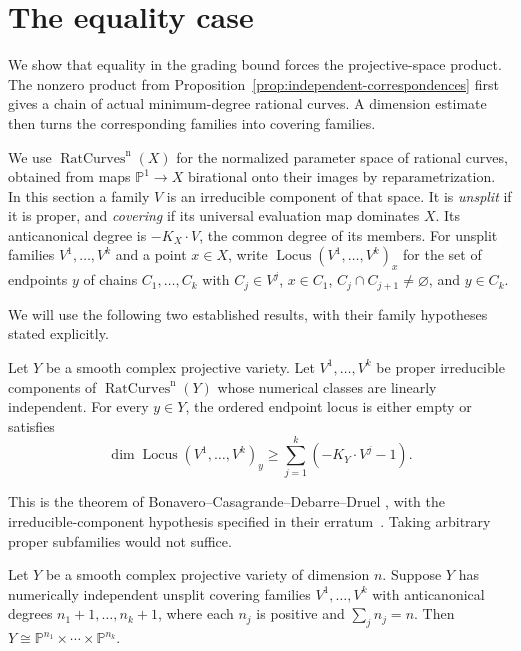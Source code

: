 \section{The equality case}
\label{sec:equality}

We show that equality in the grading bound forces the projective-space
product.  The nonzero product from
Proposition~\ref{prop:independent-correspondences} first gives a chain
of actual minimum-degree rational curves.  A dimension estimate then
turns the corresponding families into covering families.

We use $\operatorname{RatCurves}^{\mathrm n}(X)$ for the normalized
parameter space of rational curves, obtained from maps
$\mathbb P^1\to X$ birational onto their images by reparametrization.
In this section a family $V$ is an irreducible component of that space.
It is \emph{unsplit} if it is proper, and \emph{covering} if its
universal evaluation map dominates $X$.  Its anticanonical degree is
$-K_X\cdot V$, the common degree of its members.  For unsplit families
$V^1,\ldots,V^k$ and a point $x\in X$, write
$\operatorname{Locus}(V^1,\ldots,V^k)_x$ for the set of endpoints $y$
of chains $C_1,\ldots,C_k$ with $C_j\in V^j$, $x\in C_1$,
$C_j\cap C_{j+1}\ne\varnothing$, and $y\in C_k$.

We will use the following two established results, with their family
hypotheses stated explicitly.

\begin{theorem}
\label{thm:ordered-chain-bound}
Let $Y$ be a smooth complex projective variety.  Let
$V^1,\ldots,V^k$ be proper irreducible components of
$\operatorname{RatCurves}^{\mathrm n}(Y)$ whose numerical classes are
linearly independent.  For every $y\in Y$, the ordered endpoint locus
is either empty or satisfies
\[
 \dim\operatorname{Locus}(V^1,\ldots,V^k)_y
 \ge\sum_{j=1}^k(-K_Y\cdot V^j-1).
\]
\end{theorem}

This is the theorem of Bonavero--Casagrande--Debarre--Druel
\cite[Theorem~5.2]{BCDD2003}, with the irreducible-component hypothesis
specified in their erratum~\cite{BCDDErratum}.  Taking arbitrary
proper subfamilies would not suffice.

\begin{theorem}
\label{thm:occhetta-product}
Let $Y$ be a smooth complex projective variety of dimension $n$.
Suppose $Y$ has numerically independent unsplit covering families
$V^1,\ldots,V^k$ with anticanonical degrees $n_1+1,\ldots,n_k+1$,
where each $n_j$ is positive and $\sum_jn_j=n$.  Then
$Y\cong\mathbb P^{n_1}\times\cdots\times\mathbb P^{n_k}$.
\end{theorem}

